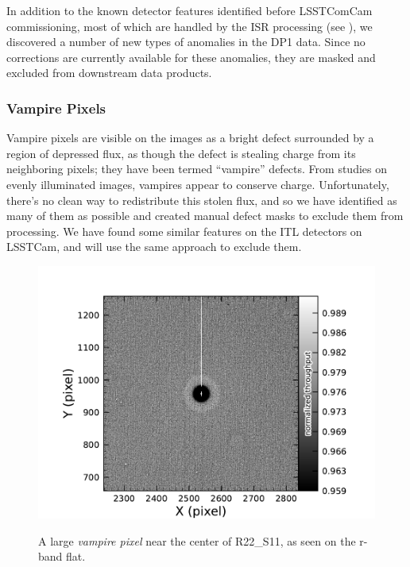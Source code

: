 In addition to the known detector features identified before LSSTComCam commissioning, most of which are handled by the ISR processing (see ), we discovered a number of new types of anomalies in the DP1 data. 
Since no corrections are currently available for these anomalies, they are masked and excluded from downstream data products.

\subsubsection{Vampire Pixels}
Vampire pixels are visible on the images as a bright defect surrounded by a region of depressed flux, as though the defect is stealing charge from its neighboring pixels; they have been termed ``vampire'' defects.
From studies on evenly illuminated images, vampires appear to conserve charge.
Unfortunately, there's no clean way to redistribute this stolen flux, and so we have identified as many of them as possible and created manual defect masks to exclude them from processing.
We have found some similar features on the ITL detectors on LSSTCam, and will use the same approach to exclude them.
\begin{figure}[htb!]
  \centering
  \includegraphics[width=0.98\linewidth]{figures/dp1_isr_anomalies-vampire_pixel.pdf}
  \label{fig:anomalies_vampire_pixels}
  \caption{
    A large \textit{vampire pixel} near the center of R22\_S11, as seen on the r-band flat.
  }
\end{figure}

